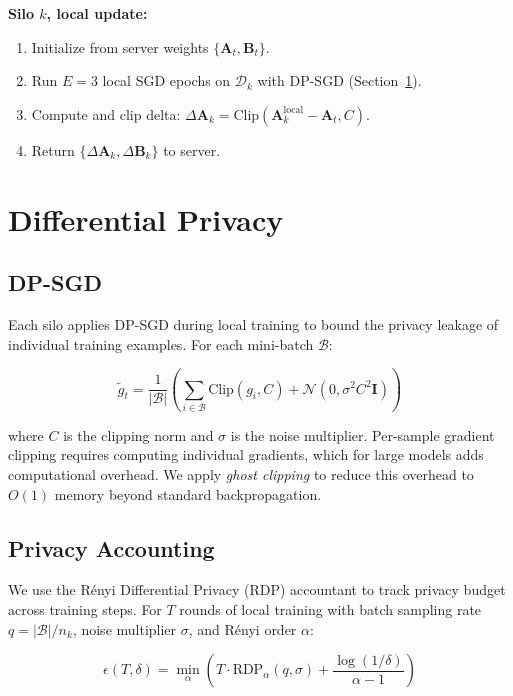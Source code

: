 \documentclass[11pt,a4paper]{article}
\begin{document}
\textbf{Silo $k$, local update:}
\begin{enumerate}
  \item Initialize from server weights $\{\mathbf{A}_t, \mathbf{B}_t\}$.
  \item Run $E=3$ local SGD epochs on $\mathcal{D}_k$ with DP-SGD (Section~\ref{sec:dp}).
  \item Compute and clip delta: $\Delta\mathbf{A}_k = \text{Clip}(\mathbf{A}_k^{\text{local}} - \mathbf{A}_t, C)$.
  \item Return $\{\Delta\mathbf{A}_k, \Delta\mathbf{B}_k\}$ to server.
\end{enumerate}

\section{Differential Privacy}
\label{sec:dp}

\subsection{DP-SGD}

Each silo applies DP-SGD during local training to bound the privacy leakage of individual training examples. For each mini-batch $\mathcal{B}$:

\begin{equation}
\tilde{g}_t = \frac{1}{|\mathcal{B}|}\left(\sum_{i \in \mathcal{B}} \text{Clip}(g_i, C) + \mathcal{N}(0, \sigma^2 C^2 \mathbf{I})\right)
\end{equation}

where $C$ is the clipping norm and $\sigma$ is the noise multiplier. Per-sample gradient clipping requires computing individual gradients, which for large models adds computational overhead. We apply \emph{ghost clipping} to reduce this overhead to $O(1)$ memory beyond standard backpropagation.

\subsection{Privacy Accounting}

We use the Rényi Differential Privacy (RDP) accountant to track privacy budget across training steps. For $T$ rounds of local training with batch sampling rate $q = |\mathcal{B}|/n_k$, noise multiplier $\sigma$, and Rényi order $\alpha$:

\begin{equation}
\epsilon(T, \delta) = \min_\alpha \left(T \cdot \text{RDP}_\alpha(q, \sigma) + \frac{\log(1/\delta)}{\alpha - 1}\right)
\end{equation}
\end{document}
